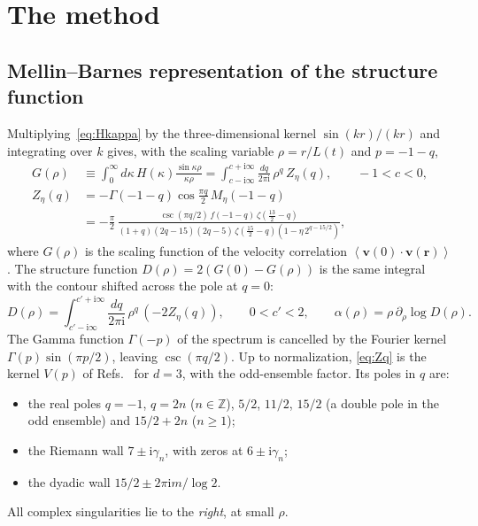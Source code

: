 \documentclass[floatfix,aps,pre,preprint,superscriptaddress,nofootinbib,amsmath,amssymb]{revtex4-2}
\def\I{\mathrm{i}}
\def\VEV#1{\left\langle #1 \right\rangle}
\newcommand{\vect}[1]{\boldsymbol{#1}}
\begin{document}
\section{The method}\label{sec:method}

\subsection{Mellin--Barnes representation of the structure function}

Multiplying~\eqref{eq:Hkappa} by the three-dimensional kernel $\sin(k r)/(k r)$ and integrating over $k$ gives, with the
scaling variable $\rho=r/L(t)$ and $p=-1-q$,
\begin{align}
    G(\rho)&\equiv\int_0^\infty d\kappa\,H(\kappa)\frac{\sin\kappa\rho}{\kappa\rho}
    =\int_{c-\I\infty}^{c+\I\infty}\frac{dq}{2\pi\I}\,\rho^{q}\,Z_\eta(q),\qquad -1<c<0,\label{eq:Grho}\\
    Z_\eta(q)&=-\Gamma(-1-q)\cos\frac{\pi q}{2}\,M_\eta(-1-q)\nonumber\\
    &=-\frac{\pi}{2}\,\frac{\csc(\pi q/2)\,f(-1-q)\,\zeta\!\left(\frac{13}{2}-q\right)}
    {(1+q)(2q-15)(2q-5)\,\zeta\!\left(\frac{15}{2}-q\right)\left(1-\eta\,2^{q-15/2}\right)} ,
    \label{eq:Zq}
\end{align}
where $G(\rho)$ is the scaling function of the velocity correlation $\VEV{\vect v(0)\cdot\vect v(\vect r)}$.
The structure function $D(\rho)=2\left(G(0)-G(\rho)\right)$ is the same
integral with the contour shifted across the pole at $q=0$:
\begin{equation}
    D(\rho)=\int_{c'-\I\infty}^{c'+\I\infty}\frac{dq}{2\pi\I}\,\rho^{q}\,\left(-2Z_\eta(q)\right),\qquad 0<c'<2,
    \qquad \alpha(\rho)=\rho\,\partial_\rho\log D(\rho).
    \label{eq:Drho}
\end{equation}
The Gamma function $\Gamma(-p)$ of the spectrum is cancelled by the Fourier kernel $\Gamma(p)\sin(\pi p/2)$, leaving
$\csc(\pi q/2)$. Up to normalization, \eqref{eq:Zq} is the kernel $V(p)$ of Refs.~\cite{migdal2024quantum,ReviewPaperAM} for
$d=3$, with the odd-ensemble factor. Its poles in $q$ are:
\begin{itemize}
\item the real poles $q=-1$, $q=2n$ ($n\in\mathbb Z$), $5/2$, $11/2$, $15/2$ (a double pole in the odd ensemble) and $15/2+2n$
($n\ge1$);
\item the Riemann wall $7\pm\I\gamma_n$, with zeros at $6\pm\I\gamma_n$;
\item the dyadic wall $15/2\pm2\pi\I m/\log2$.
\end{itemize}
All complex singularities lie to the \emph{right}, at small $\rho$.
\end{document}
